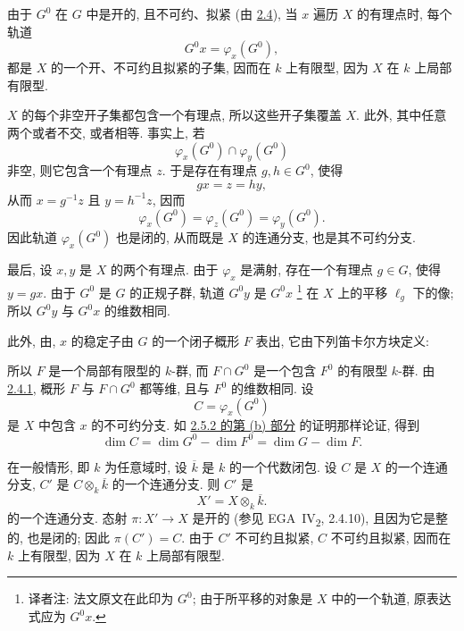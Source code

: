由于 \(G^0\) 在 \(G\) 中是开的, 且不可约、拟紧
(由 \hyperref[prop:sga3-VIA-2.4]{2.4}),
当 \(x\) 遍历 \(X\) 的有理点时, 每个轨道
\[
  G^0x=\varphi_x(G^0),
\]
都是 \(X\) 的一个开、不可约且拟紧的子集,
因而在 \(k\) 上有限型, 因为 \(X\) 在 \(k\) 上局部有限型.

\(X\) 的每个非空开子集都包含一个有理点,
所以这些开子集覆盖 \(X\).
此外, 其中任意两个或者不交, 或者相等.
事实上, 若
\[
  \varphi_x(G^0)\cap\varphi_y(G^0)
\]
非空, 则它包含一个有理点 \(z\).
于是存在有理点 \(g,h\in G^0\), 使得
\[
  gx=z=hy,
\]
从而 \(x=g^{-1}z\) 且 \(y=h^{-1}z\), 因而
\[
  \varphi_x(G^0)=\varphi_z(G^0)=\varphi_y(G^0).
\]
因此轨道 \(\varphi_x(G^0)\) 也是闭的,
从而既是 \(X\) 的连通分支, 也是其不可约分支.

最后, 设 \(x,y\) 是 \(X\) 的两个有理点.
由于 \(\varphi_x\) 是满射, 存在一个有理点 \(g\in G\),
使得 \(y=gx\).
由于 \(G^0\) 是 \(G\) 的正规子群,
轨道 \(G^0y\) 是 \(G^0x\)\begingroup
\renewcommand{\thefootnote}{\fnsymbol{footnote}}%
\footnote[1]{译者注: 法文原文在此印为 \(G^0\);
由于所平移的对象是 \(X\) 中的一个轨道,
原表达式应为 \(G^0x\).}%
\endgroup
在 \(X\) 上的平移 \(\ell_g\) 下的像;
所以 \(G^0y\) 与 \(G^0x\) 的维数相同.

此外, 由,
\(x\) 的稳定子由 \(G\) 的一个闭子概形 \(F\) 表出,
它由下列笛卡尔方块定义:
\begin{center}
  \label{diag:sga3-VIA-2.5.4-stabilizer}%
\end{center}
所以 \(F\) 是一个局部有限型的 \(k\)-群,
而 \(F\cap G^0\) 是一个包含 \(F^0\) 的有限型 \(k\)-群.
由 \hyperref[cor:sga3-VIA-2.4.1]{2.4.1},
概形 \(F\) 与 \(F\cap G^0\) 都等维, 且与 \(F^0\) 的维数相同.
设
\[
  C=\varphi_x(G^0)
\]
是 \(X\) 中包含 \(x\) 的不可约分支.
如 \hyperref[prop:sga3-VIA-2.5.2]{2.5.2 的第 (b) 部分} 的证明那样论证, 得到
\[
  \dim C=\dim G^0-\dim F^0=\dim G-\dim F.
\]

在一般情形, 即 \(k\) 为任意域时,
设 \(\overline{k}\) 是 \(k\) 的一个代数闭包.
设 \(C\) 是 \(X\) 的一个连通分支,
\(C'\) 是 \(C\otimes_k\overline{k}\) 的一个连通分支.
则 \(C'\) 是
\[
  X'=X\otimes_k\overline{k}.
\]
的一个连通分支.
态射 \(\pi:X'\to X\) 是开的
(参见 EGA~IV\textsubscript{2}, 2.4.10),
且因为它是整的, 也是闭的; 因此 \(\pi(C')=C\).
由于 \(C'\) 不可约且拟紧, \(C\) 不可约且拟紧,
因而在 \(k\) 上有限型, 因为 \(X\) 在 \(k\) 上局部有限型.

